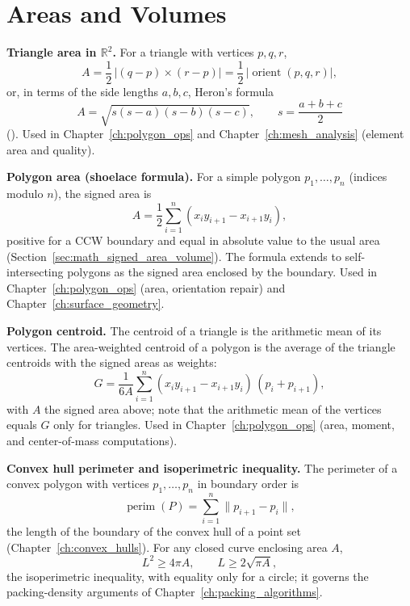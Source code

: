 
\section{Areas and Volumes}
\label{sec:app_formulas_areas_volumes}

\medskip\noindent\textbf{Triangle area in $\mathbb{R}^2$.}
For a triangle with vertices $p, q, r$,
\[
  A = \frac{1}{2}\,\bigl|(q - p)\times(r - p)\bigr|
  = \frac{1}{2}\,\bigl|\operatorname{orient}(p,q,r)\bigr|,
\]
or, in terms of the side lengths $a, b, c$, Heron's formula
\[
  A = \sqrt{s(s-a)(s-b)(s-c)},
  \qquad
  s = \frac{a + b + c}{2}
\]
(\cite{weisstein2004}). Used in Chapter~\ref{ch:polygon_ops} and
Chapter~\ref{ch:mesh_analysis} (element area and quality).

\medskip\noindent\textbf{Polygon area (shoelace formula).}
For a simple polygon $p_1, \dots, p_n$ (indices modulo $n$), the signed
area is
\[
  A = \frac{1}{2}\sum_{i=1}^{n} (x_i y_{i+1} - x_{i+1} y_i),
\]
positive for a CCW boundary and equal in absolute value to the usual area
(Section~\ref{sec:math_signed_area_volume}). The formula extends to
self-intersecting polygons as the signed area enclosed by the boundary.
Used in Chapter~\ref{ch:polygon_ops} (area, orientation repair) and
Chapter~\ref{ch:surface_geometry}.

\medskip\noindent\textbf{Polygon centroid.}
The centroid of a triangle is the arithmetic mean of its vertices. The
area-weighted centroid of a polygon is the average of the triangle
centroids with the signed areas as weights:
\[
  G = \frac{1}{6A}\sum_{i=1}^{n} (x_i y_{i+1} - x_{i+1} y_i)\,(p_i + p_{i+1}),
\]
with $A$ the signed area above; note that the arithmetic mean of the
vertices equals $G$ only for triangles. Used in Chapter~\ref{ch:polygon_ops}
(area, moment, and center-of-mass computations).

\medskip\noindent\textbf{Convex hull perimeter and isoperimetric inequality.}
The perimeter of a convex polygon with vertices $p_1, \dots, p_n$ in
boundary order is
\[
  \operatorname{perim}(P) = \sum_{i=1}^{n}\|p_{i+1} - p_i\|,
\]
the length of the boundary of the convex hull of a point set
(Chapter~\ref{ch:convex_hulls}). For any closed curve enclosing area $A$,
\[
  L^2 \ge 4\pi A,
  \qquad
  L \ge 2\sqrt{\pi A},
\]
the isoperimetric inequality, with equality only for a circle; it governs
the packing-density arguments of Chapter~\ref{ch:packing_algorithms}.

